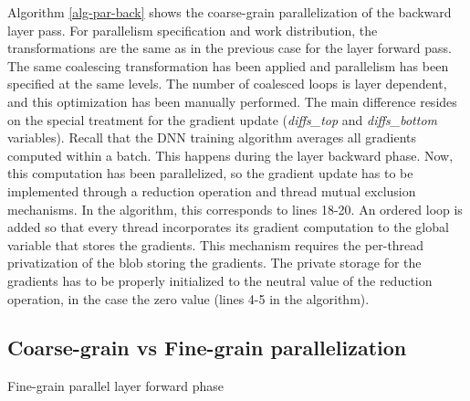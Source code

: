 Algorithm \ref{alg-par-back} shows the coarse-grain parallelization of 
the backward layer pass. For parallelism specification and work 
distribution, the transformations are the same as in the previous 
case for the layer forward pass. The same coalescing transformation has 
been applied and parallelism has been specified at the same levels. 
The number of coalesced loops is layer dependent, and this optimization 
has been manually performed. The main difference resides on the special 
treatment for the gradient update (\emph{diffs\_top} and \emph{diffs\_bottom} 
variables). Recall that the DNN training algorithm averages all gradients 
computed within a batch. This happens during the layer backward phase.
Now, this computation has been parallelized, so the gradient update has 
to be implemented through a reduction operation and thread mutual exclusion 
mechanisms. In the algorithm, this corresponds to lines 18-20. An ordered loop 
is added so that every thread incorporates its gradient computation to 
the global variable that stores the gradients.
This mechanism requires the per-thread privatization of the blob storing 
the gradients. The private storage for the gradients has to be properly 
initialized to the neutral value of the reduction operation, in the case 
the zero value (lines 4-5 in the algorithm). 

\subsection{Coarse-grain vs Fine-grain parallelization}


\begin{algorithm}
\caption{Fine-grain parallel layer forward phase}
\label{alg-fine-par-forw}
\BlankLine
{}
\end{algorithm}

